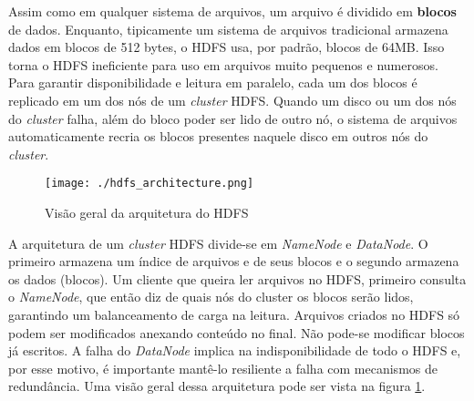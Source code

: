 Assim como em qualquer sistema de arquivos, um arquivo é dividido em \textbf{blocos} de dados. Enquanto, tipicamente um sistema de arquivos tradicional armazena dados em blocos de 512 bytes, o HDFS usa, por padrão, blocos de 64MB. Isso torna o HDFS ineficiente para uso em arquivos muito pequenos e numerosos. Para garantir disponibilidade e leitura em paralelo, cada um dos blocos é replicado em um dos nós de um \textit{cluster} HDFS. Quando um disco ou um dos nós do \textit{cluster} falha, além do bloco poder ser lido de outro nó, o sistema de arquivos automaticamente recria os blocos presentes naquele disco em outros nós do \textit{cluster}.
\begin{figure}
	\centering
	\texttt{[image: ./hdfs\_architecture.png]}
	\caption{Visão geral da arquitetura do HDFS}
	\label{fig:hdfs_arch}
\end{figure}

A arquitetura de um \textit{cluster} HDFS divide-se em \textit{NameNode} e \textit{DataNode}. O primeiro armazena um índice de arquivos e de seus blocos e o segundo armazena os dados (blocos). Um cliente que queira ler arquivos no HDFS, primeiro consulta o \textit{NameNode}, que então diz de quais nós do cluster os blocos serão lidos, garantindo um balanceamento de carga na leitura. Arquivos criados no HDFS só podem ser modificados anexando conteúdo no final. Não pode-se modificar blocos já escritos. A falha do \textit{DataNode} implica na indisponibilidade de todo o HDFS e, por esse motivo, é importante mantê-lo resiliente a falha com mecanismos de redundância. Uma visão geral dessa arquitetura pode ser vista na figura \ref{fig:hdfs_arch}.

